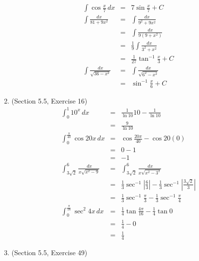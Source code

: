 \documentclass{article}
\begin{document}
\begin{enumerate}
\begin{eqnarray}
            \int{\cos{\frac{x}{7}}\,dx} &=& 7\sin{\frac{x}{7}} + C \\
            \int{\frac{dx}{81 + 9x^2}} &=& \int{\frac{dx}{9^2 + 9x^2}} \\
                                       &=& \int{\frac{dx}{9(9 + x^2)}} \\
                                       &=& \frac{1}{9}\int{\frac{dx}{3^2 + x^2}} \\
                                       &=& \frac{1}{27}\tan^{-1}{\frac{x}{3}} + C \\
            \int{\frac{dx}{\sqrt{36 - x^2}}} &=& \int{\frac{dx}{\sqrt{6^2 - x^2}}} \\
                                             &=& \sin^{-1}{\frac{x}{6}} + C
        \end{eqnarray}
    \item (Section 5.5, Exercise 16)
        \begin{eqnarray}
            \int_0^1{10^x\,dx} &=& \frac{1}{\ln{10}}10 - \frac{1}{\ln{10}} \\
                               &=& \frac{9}{\ln{10}} \\
            \int_0^{\frac{\pi}{40}}{\cos{20x}\,dx} &=& \cos{\frac{20\pi}{40}} - \cos{20(0)} \\
                                                   &=& 0 - 1 \\
                                                   &=& -1 \\
            \int_{3\sqrt{2}}^6{\frac{\,dx}{x\sqrt{x^2 - 9}}} &=& \int_{3\sqrt{2}}^6{\frac{\,dx}{x\sqrt{x^2 - 3^2}}} \\
                                                             &=& \frac{1}{3}\sec^{-1}{\left|\frac{6}{3}\right|} - \frac{1}{3}\sec^{-1}{\left|\frac{3\sqrt{2}}{3}\right|} \\
                                                             &=& \frac{1}{3}\sec^{-1}{\frac{\pi}{3}} - \frac{1}{3}\sec^{-1}{\frac{\pi}{4}} \\
            \int_0^{\frac{\pi}{16}}{\sec^2{4x}\,dx} &=& \frac{1}{4}\tan{\frac{4\pi}{16}} - \frac{1}{4}\tan{0} \\
                                                    &=& \frac{1}{4} - 0 \\
                                                    &=& \frac{1}{4}
        \end{eqnarray}
    \item (Section 5.5, Exercise 49)
        \begin{eqnarray}

\end{eqnarray}
\end{enumerate}
\end{document}

